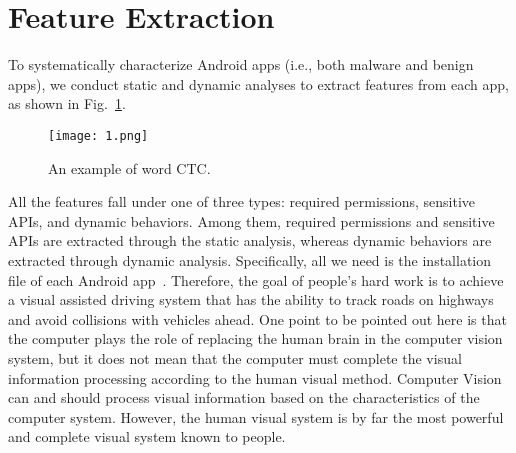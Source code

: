 \documentclass[10pt,twocolumn,letterpaper]{article}
\begin{document}
\section{Feature Extraction}
To systematically characterize Android apps (i.e., both malware and benign apps), we conduct static and dynamic analyses to extract features from each app, as shown in Fig.~\ref{1}.
\begin{figure}[!htb]
\centering
\texttt{[image: 1.png]}
\caption{An example of word CTC. }
\label{1}
\end{figure}


All the features fall under one of three types: required permissions, sensitive APIs, and dynamic behaviors. Among them, required permissions and sensitive APIs are extracted through the static analysis, whereas dynamic behaviors are extracted through dynamic analysis. Specifically, all we need is the installation file of each Android app~\cite{Gao2018RaptorX}.
Therefore, the goal of people's hard work is to achieve a visual assisted driving system that has the ability to track roads on highways and avoid collisions with vehicles ahead. One point to be pointed out here is that the computer plays the role of replacing the human brain in the computer vision system, but it does not mean that the computer must complete the visual information processing according to the human visual method. Computer Vision can and should process visual information based on the characteristics of the computer system. However, the human visual system is by far the most powerful and complete visual system known to people.


{\small


}
\end{document}
